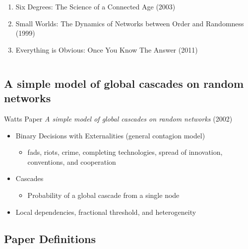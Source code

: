 \documentclass[compress]{beamer}
\begin{document}
\begin{frame}[Basic2]
\begin{columns}
\begin{column}{0.6\textwidth}
\begin{itemize}
\begin{enumerate}
                        \footnotesize
                        \item Six Degrees: The Science of a Connected Age (2003)
                        \item Small Worlds: The Dynamics of Networks between Order and Randomness (1999)
                        \item Everything is Obvious: Once You Know The Answer (2011)
                    \end{enumerate}
                \end{itemize}
            \end{column}
        \end{columns}
    \end{frame}

\subsection{A simple model of global cascades on random networks}

    \begin{frame}[Basic2]{Watts Paper}
        \textit{A simple model of global cascades on random networks} (2002)
        
        \begin{itemize}
            \item Binary Decisions with Externalities (general contagion model)
            \begin{itemize}
                \item fads, riots, crime, completing technologies, spread of innovation, conventions, and cooperation
            \end{itemize}
            \item Cascades
            \begin{itemize}
                \item Probability of a global cascade from a single node
            \end{itemize}
            \item Local dependencies, fractional threshold, and heterogeneity
        \end{itemize}
    \end{frame}

\subsection{Paper Definitions}
\end{document}

